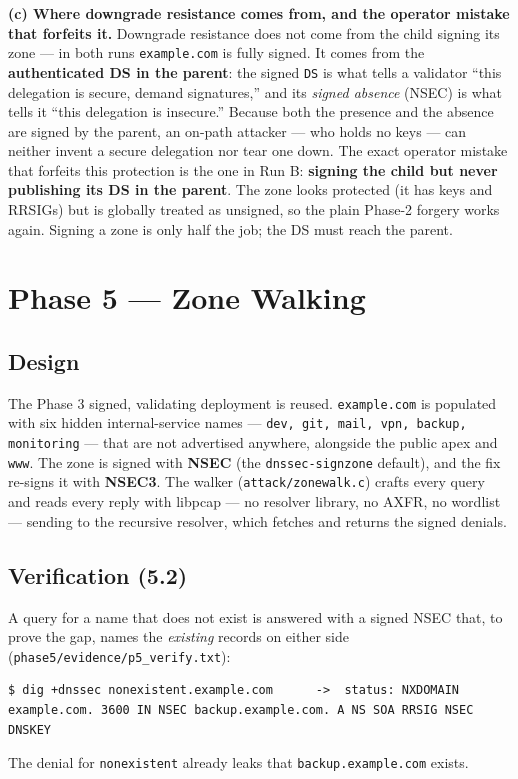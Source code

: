 \documentclass[11pt,a4paper]{article}
\begin{document}
\textbf{(c) Where downgrade resistance comes from, and the operator mistake that forfeits it.}
Downgrade resistance does not come from the child signing its zone --- in both runs
\texttt{example.com} is fully signed. It comes from the \textbf{authenticated DS in the parent}: the
signed \texttt{DS} is what tells a validator ``this delegation is secure, demand signatures,'' and
its \emph{signed absence} (NSEC) is what tells it ``this delegation is insecure.'' Because both the
presence and the absence are signed by the parent, an on-path attacker --- who holds no keys --- can
neither invent a secure delegation nor tear one down. The exact operator mistake that forfeits this
protection is the one in Run B: \textbf{signing the child but never publishing its DS in the parent}.
The zone looks protected (it has keys and RRSIGs) but is globally treated as unsigned, so the plain
Phase-2 forgery works again. Signing a zone is only half the job; the DS must reach the parent.


\section{Phase 5 --- Zone Walking}

\subsection{Design}
The Phase 3 signed, validating deployment is reused. \texttt{example.com} is populated with six
hidden internal-service names --- \texttt{dev, git, mail, vpn, backup, monitoring} --- that are not
advertised anywhere, alongside the public apex and \texttt{www}. The zone is signed with
\textbf{NSEC} (the \texttt{dnssec-signzone} default), and the fix re-signs it with \textbf{NSEC3}.
The walker (\texttt{attack/zonewalk.c}) crafts every query and reads every reply with libpcap --- no
resolver library, no AXFR, no wordlist --- sending to the recursive resolver, which fetches and
returns the signed denials.

\subsection{Verification (5.2)}
A query for a name that does not exist is answered with a signed NSEC that, to prove the gap, names
the \emph{existing} records on either side (\texttt{phase5/evidence/p5\_verify.txt}):
\begin{lstlisting}
$ dig +dnssec nonexistent.example.com      ->  status: NXDOMAIN
example.com. 3600 IN NSEC backup.example.com. A NS SOA RRSIG NSEC DNSKEY
\end{lstlisting}
The denial for \texttt{nonexistent} already leaks that \texttt{backup.example.com} exists.
\end{document}
